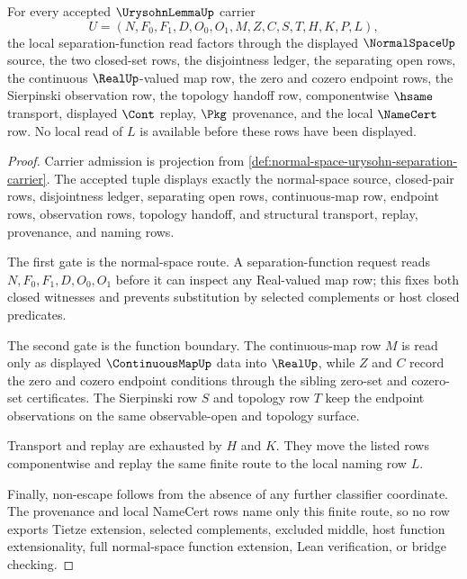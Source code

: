 \begin{theorem}
\label{thm:normal-space-urysohn-separation-route}
For every accepted $\UrysohnLemmaUp$ carrier
$$
U=(N,F_0,F_1,D,O_0,O_1,M,Z,C,S,T,H,K,P,L),
$$
the local separation-function read factors through the displayed $\NormalSpaceUp$ source, the two closed-set rows, the disjointness ledger, the separating open rows, the continuous $\RealUp$-valued map row, the zero and cozero endpoint rows, the Sierpinski observation row, the topology handoff row, componentwise $\hsame$ transport, displayed $\Cont$ replay, $\Pkg$ provenance, and the local $\NameCert$ row. No local read of $L$ is available before these rows have been displayed.
\end{theorem}
\begin{proof}
Carrier admission is projection from \autoref{def:normal-space-urysohn-separation-carrier}. The accepted tuple displays exactly the normal-space source, closed-pair rows, disjointness ledger, separating open rows, continuous-map row, endpoint rows, observation rows, topology handoff, and structural transport, replay, provenance, and naming rows.

The first gate is the normal-space route. A separation-function request reads $N,F_0,F_1,D,O_0,O_1$ before it can inspect any Real-valued map row; this fixes both closed witnesses and prevents substitution by selected complements or host closed predicates.

The second gate is the function boundary. The continuous-map row $M$ is read only as displayed $\ContinuousMapUp$ data into $\RealUp$, while $Z$ and $C$ record the zero and cozero endpoint conditions through the sibling zero-set and cozero-set certificates. The Sierpinski row $S$ and topology row $T$ keep the endpoint observations on the same observable-open and topology surface.

Transport and replay are exhausted by $H$ and $K$. They move the listed rows componentwise and replay the same finite route to the local naming row $L$.

Finally, non-escape follows from the absence of any further classifier coordinate. The provenance and local NameCert rows name only this finite route, so no row exports Tietze extension, selected complements, excluded middle, host function extensionality, full normal-space function extension, Lean verification, or bridge checking.
\end{proof}


